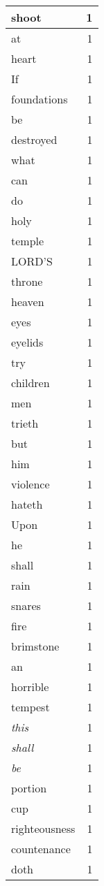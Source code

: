 \begin{center}
\begin{longtable}{l|r}
shoot & 1 \\ \hline
at & 1 \\ \hline
heart & 1 \\ \hline
If & 1 \\ \hline
foundations & 1 \\ \hline
be & 1 \\ \hline
destroyed & 1 \\ \hline
what & 1 \\ \hline
can & 1 \\ \hline
do & 1 \\ \hline
holy & 1 \\ \hline
temple & 1 \\ \hline
LORD'S & 1 \\ \hline
throne & 1 \\ \hline
heaven & 1 \\ \hline
eyes & 1 \\ \hline
eyelids & 1 \\ \hline
try & 1 \\ \hline
children & 1 \\ \hline
men & 1 \\ \hline
trieth & 1 \\ \hline
but & 1 \\ \hline
him & 1 \\ \hline
violence & 1 \\ \hline
hateth & 1 \\ \hline
Upon & 1 \\ \hline
he & 1 \\ \hline
shall & 1 \\ \hline
rain & 1 \\ \hline
snares & 1 \\ \hline
fire & 1 \\ \hline
brimstone & 1 \\ \hline
an & 1 \\ \hline
horrible & 1 \\ \hline
tempest & 1 \\ \hline
\emph{this} & 1 \\ \hline
\emph{shall} & 1 \\ \hline
\emph{be} & 1 \\ \hline
portion & 1 \\ \hline
cup & 1 \\ \hline
righteousness & 1 \\ \hline
countenance & 1 \\ \hline
doth & 1 \\ \hline
\end{longtable}
\end{center}



